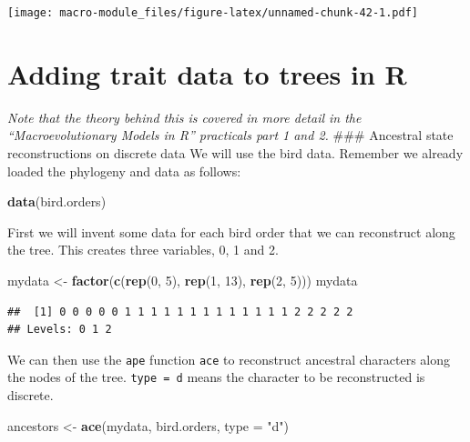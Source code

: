 \documentclass[]{book}
\newenvironment{Shaded}{\begin{snugshade}}{\end{snugshade}}
\newcommand{\KeywordTok}[1]{\textcolor[rgb]{0.13,0.29,0.53}{\textbf{{#1}}}}
\newcommand{\DataTypeTok}[1]{\textcolor[rgb]{0.13,0.29,0.53}{{#1}}}
\newcommand{\DecValTok}[1]{\textcolor[rgb]{0.00,0.00,0.81}{{#1}}}
\newcommand{\StringTok}[1]{\textcolor[rgb]{0.31,0.60,0.02}{{#1}}}
\newcommand{\NormalTok}[1]{{#1}}
\theoremstyle{definition}
\theoremstyle{definition}
\theoremstyle{definition}
\theoremstyle{remark}
\begin{document}
\texttt{[image: macro-module\_files/figure-latex/unnamed-chunk-42-1.pdf]}

\section{Adding trait data to trees in
R}\label{adding-trait-data-to-trees-in-r}

\emph{Note that the theory behind this is covered in more detail in the
``Macroevolutionary Models in R'' practicals part 1 and 2.} \#\#\#
Ancestral state reconstructions on discrete data We will use the bird
data. Remember we already loaded the phylogeny and data as follows:

\begin{Shaded}
\begin{Highlighting}[]
\KeywordTok{data}\NormalTok{(bird.orders)}
\end{Highlighting}
\end{Shaded}

First we will invent some data for each bird order that we can
reconstruct along the tree. This creates three variables, 0, 1 and 2.

\begin{Shaded}
\begin{Highlighting}[]
\NormalTok{mydata <-}\StringTok{ }\KeywordTok{factor}\NormalTok{(}\KeywordTok{c}\NormalTok{(}\KeywordTok{rep}\NormalTok{(}\DecValTok{0}\NormalTok{, }\DecValTok{5}\NormalTok{), }\KeywordTok{rep}\NormalTok{(}\DecValTok{1}\NormalTok{, }\DecValTok{13}\NormalTok{), }\KeywordTok{rep}\NormalTok{(}\DecValTok{2}\NormalTok{, }\DecValTok{5}\NormalTok{)))}
\NormalTok{mydata}
\end{Highlighting}
\end{Shaded}

\begin{verbatim}
##  [1] 0 0 0 0 0 1 1 1 1 1 1 1 1 1 1 1 1 1 2 2 2 2 2
## Levels: 0 1 2
\end{verbatim}

We can then use the \texttt{ape} function \texttt{ace} to reconstruct
ancestral characters along the nodes of the tree. \texttt{type\ =\ d}
means the character to be reconstructed is discrete.

\begin{Shaded}
\begin{Highlighting}[]
\NormalTok{ancestors <-}\StringTok{ }\KeywordTok{ace}\NormalTok{(mydata, bird.orders, }\DataTypeTok{type =} \StringTok{"d"}\NormalTok{)}
\end{Highlighting}
\end{Shaded}
\end{document}
